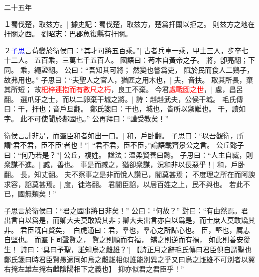 二十五年

１蜀伐楚，取兹方。|{
	據史記：蜀伐楚，取兹方，楚爲扞關以拒之。
	則兹方之地在扞關之西。
	劉昭志：巴郡魚復縣有扞關。
	}

２\textcolor{blue}{子思}言苟變於衛侯曰：“其才可將五百乘。”|{
	古者兵車一乘，甲士三人，步卒七十二人。
	五百乘，三萬七千五百人。
	國語曰：苟本自黃帝之子。
	將，卽亮翻；下同。
	乘，繩證翻。
	}
公曰：“吾知其可將；
	然變也嘗爲吏，
	賦於民而食人二鷄子，
	故弗用也。”
子思曰：“夫聖人之官人，猶匠之用木也，|{
	夫，音扶。
	}
取其所長，棄其所短；
故\textcolor{red}{𣏌梓連抱而有數尺之朽}，良工不棄。
今君\textcolor{red}{處戰國之世}，|{
	處，昌呂翻。
	}
選爪牙之士，而以二卵棄干城之將。|{
	詩：赳赳武夫，公侯干城。
	毛氏傳曰：干，扞也；音戶旦翻。
	鄭氏箋曰：干也，城也，皆所以禦難也。
	干，讀如字。
	}
此不可使聞於鄰國也。”
公再拜曰：“謹受教矣！”

衛侯言計非是，而羣臣和者如出一口。|{
	和，戶卧翻。
	}
子思曰：“以吾觀衛，所謂‘君不君，臣不臣’者也！”|{
	“君不君，臣不臣，”論語載齊景公之言。
	}
公丘懿子曰：“何乃若是？”|{
	公丘，複姓。
	諡法：温柔賢善曰懿。
	}
子思曰：“人主自臧，則衆謀不進。|{
	臧，善也。}
事是而臧之，猶卻衆謀，況和非以長惡乎！|{
	和，戶卧翻。
	長，知丈翻。}
夫不察事之是非而悅人讚已，闇莫甚焉；
不度理之所在而阿諛求容，諂莫甚焉。|{
	度，徒洛翻。}
君闇臣諂，以居百姓之上，民不與也。
若此不已，國無類矣！”

子思言於衛侯曰：“君之國事將日非矣！”
公曰：“何故？”
對曰：“有由然焉。君出言自以爲是，而卿大夫莫敢矯其非；卿大夫出言亦自以爲是，而士庶人莫敢矯其非。
	君臣旣自賢矣，|{
		白虎通曰：君，羣也，羣心之所歸心也。
		臣，堅也，厲志自堅也。
		}
	而羣下同聲賢之，
	賢之則順而有福，
	矯之則逆而有禍，
	如此則善安從生！
	詩曰：‘具曰予聖，誰知烏之雌雄？’|{
		【詩正月之辭毛氏傳曰君臣俱自謂聖也鄭氏箋曰時君臣賢愚適同如烏之雌雄相似誰能別異之乎又曰烏之雌雄不可別者以翼右掩左雄左掩右雌陰陽相下之義也】
		}
	抑亦似君之君臣乎！”

